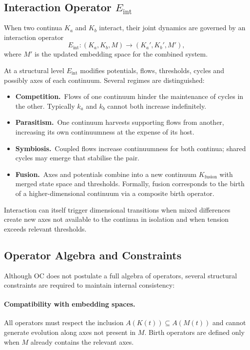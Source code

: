 \subsection{Interaction Operator \texorpdfstring{$E_{\mathrm{int}}$}{E\_int}}

When two continua \(K_a\) and \(K_b\) interact, their joint dynamics are
governed by an interaction operator
\[
  E_{\mathrm{int}} : (K_a, K_b, M)
    \longrightarrow (K_a', K_b', M'),
\]
where \(M'\) is the updated embedding space for the combined system.

At a structural level \(E_{\mathrm{int}}\) modifies potentials, flows,
thresholds, cycles and possibly axes of each continuum. Several regimes are
distinguished:

\begin{itemize}
  \item \textbf{Competition.}\
        Flows of one continuum hinder the maintenance of cycles in the other.
        Typically \(k_a\) and \(k_b\) cannot both increase indefinitely.
  \item \textbf{Parasitism.}\
        One continuum harvests supporting flows from another, increasing its
        own continuumness at the expense of its host.
  \item \textbf{Symbiosis.}\
        Coupled flows increase continuumness for both continua; shared cycles
        may emerge that stabilise the pair.
  \item \textbf{Fusion.}\
        Axes and potentials combine into a new continuum
        \(K_{\mathrm{fusion}}\) with merged state space and thresholds.
        Formally, fusion corresponds to the birth of a higher-dimensional
        continuum via a composite birth operator.
\end{itemize}

Interaction can itself trigger dimensional transitions when mixed differences
create new axes not available to the continua in isolation and when tension
exceeds relevant thresholds.

\subsection{Operator Algebra and Constraints}

Although OC does not postulate a full algebra of operators, several structural
constraints are required to maintain internal consistency:

\paragraph{Compatibility with embedding spaces.}
All operators must respect the inclusion
\(A(K(t)) \subseteq A(M(t))\) and cannot generate evolution along axes not
present in \(M\). Birth operators are defined only when \(M\) already contains
the relevant axes.

